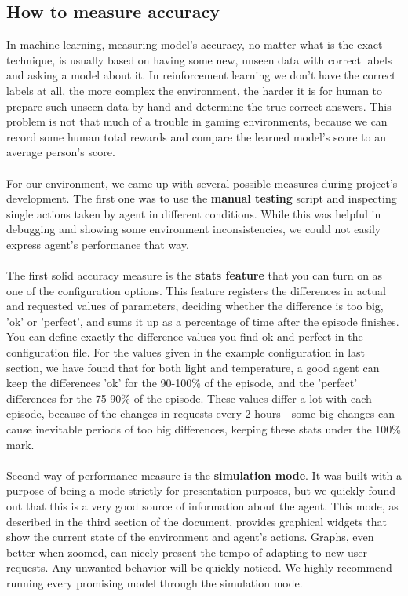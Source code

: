 \documentclass{article}
\begin{document}
\subsection{How to measure accuracy}
In machine learning, measuring model's accuracy, no matter what is the exact technique, is usually based on having some new, unseen data with correct labels and asking a model about it. In reinforcement learning we don't have the correct labels at all, the more complex the environment, the harder it is for human to prepare such unseen data by hand and determine the true correct answers. This problem is not that much of a trouble in gaming environments, because we can record some human total rewards and compare the learned model's score to an average person's score.
\\\\
For our environment, we came up with several possible measures during project's development. The first one was to use the \textbf{manual testing} script and inspecting single actions taken by agent in different conditions. While this was helpful in debugging and showing some environment inconsistencies, we could not easily express agent's performance that way. 
\\\\
The first solid accuracy measure is the \textbf{stats feature} that you can turn on as one of the configuration options. This feature registers the differences in actual and requested values of parameters, deciding whether the difference is too big, 'ok' or 'perfect', and sums it up as a percentage of time after the episode finishes. You can define exactly the difference values you find ok and perfect in the configuration file. For the values given in the example configuration in last section, we have found that for both light and temperature, a good agent can keep the differences 'ok' for the 90-100\% of the episode, and the 'perfect' differences for the 75-90\% of the episode. These values differ a lot with each episode, because of the changes in requests every 2 hours - some big changes can cause inevitable periods of too big differences, keeping these stats under the 100\% mark.
\\\\
Second way of performance measure is the \textbf{simulation mode}. It was built with a purpose of being a mode strictly for presentation purposes, but we quickly found out that this is a very good source of information about the agent. This mode, as described in the third section of the document, provides graphical widgets that show the current state of the environment and agent's actions. Graphs, even better when zoomed, can nicely present the tempo of adapting to new user requests. Any unwanted behavior will be quickly noticed. We highly recommend running every promising model through the simulation mode.
\end{document}
